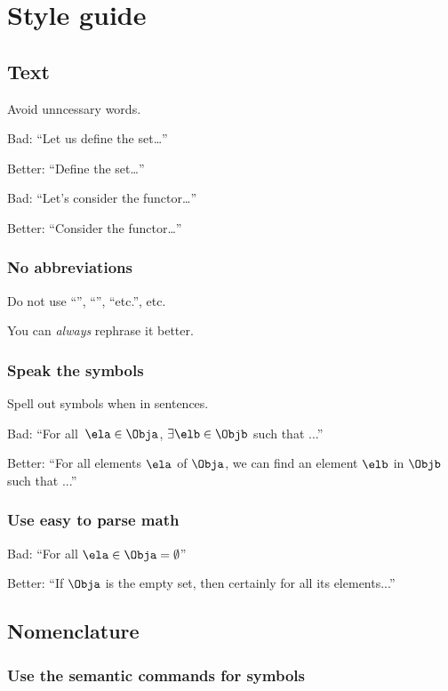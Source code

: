 
\section{Style guide}
\subsection*{Text}

Avoid unncessary words.

Bad: ``Let us define the set\dots''

Better: ``Define the set\dots''

Bad: ``Let's consider the functor\dots''

Better: ``Consider the functor\dots ''

\subsubsection*{No abbreviations}
Do not use ``\ie '', ``\eg '', ``etc.'', etc.

You can \emph{always} rephrase it better.

\subsubsection*{Speak the symbols}
Spell out symbols when in sentences.

Bad: ``For all~$\ela \in \Obja$, $\exists \elb \in \Objb$ such that ...''

Better: ``For all elements $\ela$ of $\Obja$, we can find an element $\elb$ in $\Objb$ such that ...''

\subsubsection*{Use easy to parse math}

Bad: ``For all $\ela\in \Obja=\emptyset$''

Better: ``If $\Obja$ is the empty set, then certainly for all its elements...''

\subsection*{Nomenclature}

\subsubsection*{Use the semantic commands for symbols}

